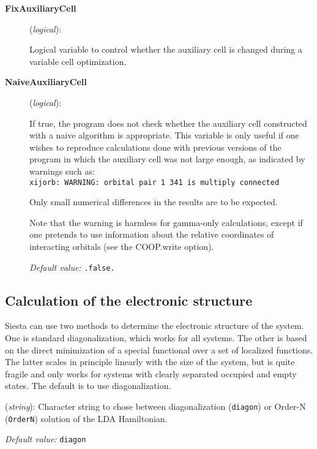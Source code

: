 \documentclass[11pt]{article}
\begin{document}
\begin{description}

\item[{\bf FixAuxiliaryCell}] ({\it logical}): 

Logical variable to control whether the auxiliary cell is changed
during a variable cell optimization.

\item[{\bf NaiveAuxiliaryCell}] ({\it logical}): 

If true, the program does not check whether the auxiliary cell
constructed with a naive algorithm is appropriate. This variable is
only useful if one wishes to reproduce calculations done with previous
versions of the program in which the auxiliary cell was not large
enough, as indicated by warnings such as:\\ \texttt{xijorb: WARNING:
  orbital pair 1 341 is multiply connected}

Only small numerical differences in the results are to be expected.

Note that the warning is harmless for gamma-only calculations, except
if one pretends to use information about the relative coordinates
of interacting orbitals (see the COOP.write option).

{\it Default value:} {\tt .false.}

\end{description}


\subsection{Calculation of the electronic structure}

{\sc Siesta} can use two methods to determine the electronic structure
of the system. One is standard diagonalization, which works for all
systems. The other is based on the direct minimization of a special
functional over a set of localized functions. The latter scales in
principle linearly with the size of the system, but is quite fragile
and only works for systems with clearly separated occupied and empty
states.  The default is to use diagonalization.

\begin{description}
\itemsep 10pt
\parsep 0pt

\item[{\bf SolutionMethod}] ({\it string}): 
Character string to chose between
diagonalization ({\tt diagon}) or Order-N ({\tt OrderN}) solution
of the LDA Hamiltonian.

{\it Default value:} {\tt diagon}

        

\end{description}
\end{document}
